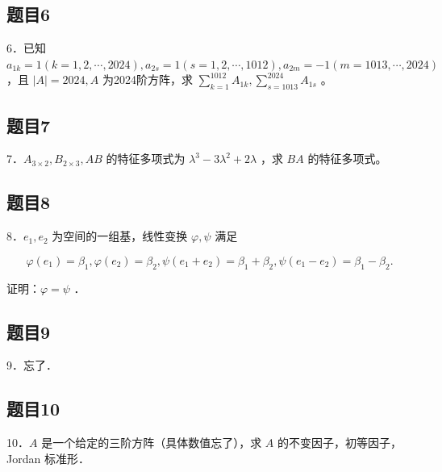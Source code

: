 \documentclass{article}
\begin{document}
\subsection{题目6}
6．已知 \(a_{1 k}=1(k=1,2, \cdots, 2024), a_{2 s}=1(s=1,2, \cdots, 1012), a_{2 m}=-1(m=1013, \cdots, 2024)\) ，且 \(|A|=2024, A\) 为2024阶方阵，求 \(\sum_{k=1}^{1012} A_{1 k}, \sum_{s=1013}^{2024} A_{1 s}\) 。

\subsection{题目7}
7．\(A_{3 \times 2}, B_{2 \times 3}, A B\) 的特征多项式为 \(\lambda^{3}-3 \lambda^{2}+2 \lambda\) ，求 \(B A\) 的特征多项式。

\subsection{题目8}
8．\(e_{1}, e_{2}\) 为空间的一组基，线性变换 \(\varphi, \psi\) 满足

\[
\varphi\left(e_{1}\right)=\beta_{1}, \varphi\left(e_{2}\right)=\beta_{2}, \psi\left(e_{1}+e_{2}\right)=\beta_{1}+\beta_{2}, \psi\left(e_{1}-e_{2}\right)=\beta_{1}-\beta_{2} .
\]

证明：\(\varphi=\psi\) ．

\subsection{题目9}
9．忘了．

\subsection{题目10}
10．\(A\) 是一个给定的三阶方阵（具体数值忘了），求 \(A\) 的不变因子，初等因子，Jordan 标准形．
\end{document}
